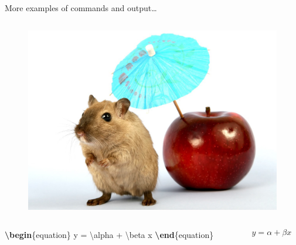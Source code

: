 \documentclass[,aspectratio=43]{beamer}
\newenvironment{Shaded}{\begin{snugshade}}{\end{snugshade}}
\newcommand{\ExtensionTok}[1]{#1}
\newcommand{\KeywordTok}[1]{\textcolor[rgb]{0.00,0.44,0.13}{\textbf{#1}}}
\newcommand{\NormalTok}[1]{#1}
\newcommand{\SpecialCharTok}[1]{\textcolor[rgb]{0.25,0.44,0.63}{#1}}
\newcommand{\SpecialStringTok}[1]{\textcolor[rgb]{0.73,0.40,0.53}{#1}}
\begin{document}
\begin{frame}[fragile]{More examples of commands and output\ldots{}}
\begin{columns}[T]
\begin{column}{0.48\textwidth}
\begin{figure}
\includegraphics{gerbil}
\end{figure}
\end{column}
\end{columns}

\begin{columns}[T]
\begin{column}{0.48\textwidth}
\begin{Shaded}
\begin{Highlighting}[]
\KeywordTok{\textbackslash{}begin}\NormalTok{\{}\ExtensionTok{equation}\NormalTok{\}}
\SpecialStringTok{y = }\SpecialCharTok{\textbackslash{}alpha}\SpecialStringTok{ + }\SpecialCharTok{\textbackslash{}beta}\SpecialStringTok{ x}
\KeywordTok{\textbackslash{}end}\NormalTok{\{}\ExtensionTok{equation}\NormalTok{\}}
\end{Highlighting}
\end{Shaded}
\end{column}

\begin{column}{0.48\textwidth}
\vspace{2.5em}

\begin{equation}
y = \alpha + \beta x
\end{equation}
\end{column}
\end{columns}
\end{frame}
\end{document}

